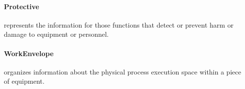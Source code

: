 \paragraph{Protective}\mbox{}
\label{sec:Protective}


 represents the information for those functions that detect or prevent harm or damage to equipment or personnel.


\paragraph{WorkEnvelope}\mbox{}
\label{sec:WorkEnvelope}


 organizes information about the physical process execution space within a piece of equipment.

